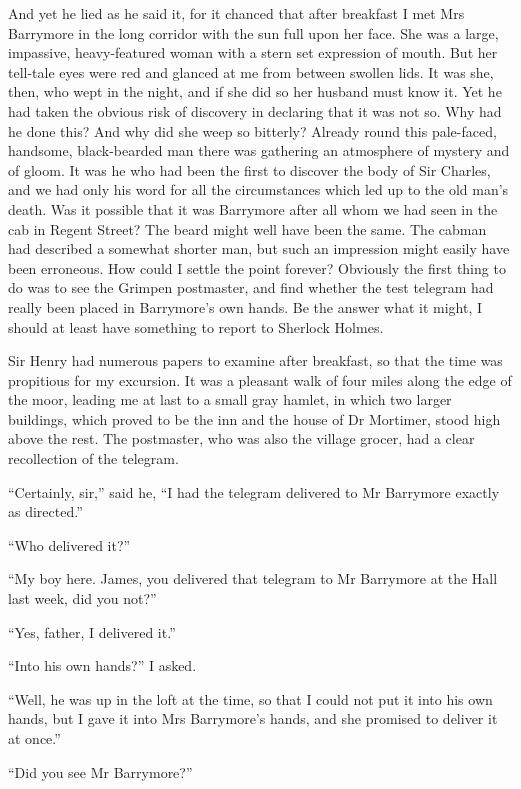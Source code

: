 \documentclass[paper=5.5in:8.5in,BCOR=7mm,twoside,DIV=calc,12pt,usegeometry,openany,chapterprefix,endperiod,headings=big]{scrbook} %
\begin{document}
And yet he lied as he said it, for it chanced that after breakfast I met Mrs Barrymore in the long corridor with the sun full upon her face. She was a large, impassive, heavy-featured woman with a stern set expression of mouth. But her tell-tale eyes were red and glanced at me from between swollen lids. It was she, then, who wept in the night, and if she did so her husband must know it. Yet he had taken the obvious risk of discovery in declaring that it was not so. Why had he done this? And why did she weep so bitterly? Already round this pale-faced, handsome, black-bearded man there was gathering an atmosphere of mystery and of gloom. It was he who had been the first to discover the body of Sir Charles, and we had only his word for all the circumstances which led up to the old man's death. Was it possible that it was Barrymore after all whom we had seen in the cab in Regent Street? The beard might well have been the same. The cabman had described a somewhat shorter man, but such an impression might easily have been erroneous. How could I settle the point forever? Obviously the first thing to do was to see the Grimpen postmaster, and find whether the test telegram had really been placed in Barrymore's own hands. Be the answer what it might, I should at least have something to report to Sherlock Holmes.

Sir Henry had numerous papers to examine after breakfast, so that the time was propitious for my excursion. It was a pleasant walk of four miles along the edge of the moor, leading me at last to a small gray hamlet, in which two larger buildings, which proved to be the inn and the house of Dr Mortimer, stood high above the rest. The postmaster, who was also the village grocer, had a clear recollection of the telegram.

\enquote{Certainly, sir,} said he, \enquote{I had the telegram delivered to Mr Barrymore exactly as directed.}

\enquote{Who delivered it?}

\enquote{My boy here. James, you delivered that telegram to Mr Barrymore at the Hall last week, did you not?}

\enquote{Yes, father, I delivered it.}

\enquote{Into his own hands?} I asked.

\enquote{Well, he was up in the loft at the time, so that I could not put it into his own hands, but I gave it into Mrs Barrymore's hands, and she promised to deliver it at once.}

\enquote{Did you see Mr Barrymore?}
\end{document}
